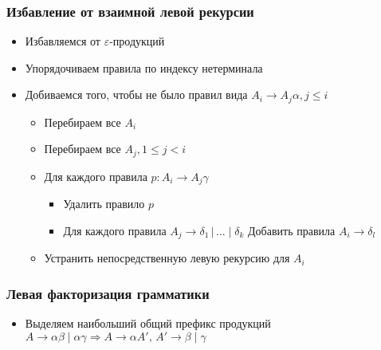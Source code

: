 \documentclass{beamer}
\begin{document}
\begin{frame}[fragile]
  \transwipe[direction=90]
  \frametitle{Избавление от взаимной левой рекурсии}
  \begin{itemize}
   \item Избавляемся от $\varepsilon$-продукций
   \item Упорядочиваем правила по индексу нетерминала
   \item Добиваемся того, чтобы не было правил вида $A_i \to A_j \alpha, j \leq i$
   \begin{itemize}
     \item Перебираем все $A_i$
     \item Перебираем все $A_j, 1 \leq j < i$
     \item Для каждого правила $p: A_i \to A_j \gamma$
     \begin{itemize}
       \item Удалить правило $p$
       \item Для каждого правила $A_j \to \delta_1 \,|\, \dots \mid \delta_k$ Добавить правила $A_i \to \delta_l$
     \end{itemize}
     \item Устранить непосредственную левую рекурсию для $A_i$
   \end{itemize}
  \end{itemize}
\end{frame}


\begin{frame}[fragile]
  \transwipe[direction=90]
  \frametitle{Левая факторизация грамматики}
  \begin{itemize}
   \item Выделяем наибольший общий префикс продукций $A \to \alpha \beta \mid \alpha \gamma \Rightarrow A\to \alpha A', \, A' \to \beta \mid \gamma$
  \end{itemize}
\end{frame}
\end{document}
